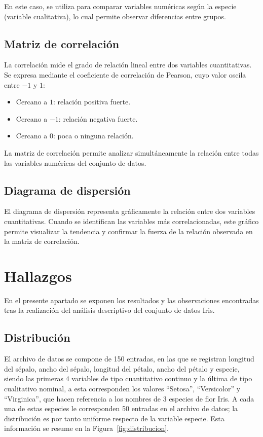 \documentclass[12pt,a4paper]{article}
\begin{document}
En este caso, se utiliza para comparar variables numéricas según la especie (variable cualitativa), lo cual permite observar diferencias entre grupos.

\subsection{Matriz de correlación}

La correlación mide el grado de relación lineal entre dos variables cuantitativas. Se expresa mediante el coeficiente de correlación de Pearson, cuyo valor oscila entre $-1$ y $1$:

\begin{itemize}
    \item Cercano a $1$: relación positiva fuerte.
    \item Cercano a $-1$: relación negativa fuerte.
    \item Cercano a $0$: poca o ninguna relación.
\end{itemize}

La matriz de correlación permite analizar simultáneamente la relación entre todas las variables numéricas del conjunto de datos.

\subsection{Diagrama de dispersión}

El diagrama de dispersión representa gráficamente la relación entre dos variables cuantitativas. Cuando se identifican las variables más correlacionadas, este gráfico permite visualizar la tendencia y confirmar la fuerza de la relación observada en la matriz de correlación.

\section{Hallazgos}

En el presente apartado se exponen los resultados y las observaciones encontradas tras la realización del análisis descriptivo del conjunto de datos Iris.

\subsection{Distribución}

El archivo de datos se compone de 150 entradas, en las que se registran longitud del sépalo, ancho del sépalo, longitud del pétalo, ancho del pétalo y especie, siendo las primeras 4 variables de tipo cuantitativo continuo y la última de tipo cualitativo nominal, a esta corresponden los valores ``Setosa'', ``Versicolor'' y ``Virginica'', que hacen referencia a los nombres de 3 especies de flor Iris. A cada una de estas especies le corresponden 50 entradas en el archivo de datos; la distribución es por tanto uniforme respecto de la variable especie. Esta información se resume en la Figura~\ref{fig:distribucion}.
\end{document}
